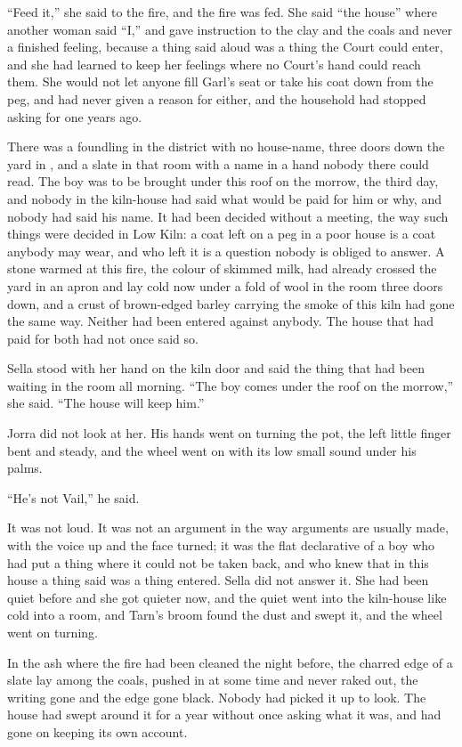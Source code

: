 “Feed it,” she said to the fire, and the fire was fed. She said “the house” where another woman said “I,” and gave instruction to the clay and the coals and never a finished feeling, because a thing said aloud was a thing the Court could enter, and she had learned to keep her feelings where no Court's hand could reach them. She would not let anyone fill Garl's seat or take his coat down from the peg, and had never given a reason for either, and the household had stopped asking for one years ago.

There was a foundling in the district with no house-name, three doors down the yard in , and a slate in that room with a name in a hand nobody there could read. The boy was to be brought under this roof on the morrow, the third day, and nobody in the kiln-house had said what would be paid for him or why, and nobody had said his name. It had been decided without a meeting, the way such things were decided in Low Kiln: a coat left on a peg in a poor house is a coat anybody may wear, and who left it is a question nobody is obliged to answer. A stone warmed at this fire, the colour of skimmed milk, had already crossed the yard in an apron and lay cold now under a fold of wool in the room three doors down, and a crust of brown-edged barley carrying the smoke of this kiln had gone the same way. Neither had been entered against anybody. The house that had paid for both had not once said so.

Sella stood with her hand on the kiln door and said the thing that had been waiting in the room all morning. “The boy comes under the roof on the morrow,” she said. “The house will keep him.”

Jorra did not look at her. His hands went on turning the pot, the left little finger bent and steady, and the wheel went on with its low small sound under his palms.

“He's not Vail,” he said.

It was not loud. It was not an argument in the way arguments are usually made, with the voice up and the face turned; it was the flat declarative of a boy who had put a thing where it could not be taken back, and who knew that in this house a thing said was a thing entered. Sella did not answer it. She had been quiet before and she got quieter now, and the quiet went into the kiln-house like cold into a room, and Tarn's broom found the dust and swept it, and the wheel went on turning.

In the ash where the fire had been cleaned the night before, the charred edge of a slate lay among the coals, pushed in at some time and never raked out, the writing gone and the edge gone black. Nobody had picked it up to look. The house had swept around it for a year without once asking what it was, and had gone on keeping its own account.

